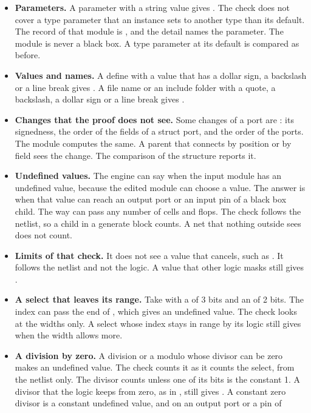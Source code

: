 \begin{itemize}
  .
\item \textbf{Parameters.} A parameter with a string value gives . The check
  does not cover a type parameter that an instance sets to another type than its default.
  The record of that module is , and the detail names the parameter. The module
  is never a black box. A type parameter at its default is compared as before.
\item \textbf{Values and names.}
  A define with a value that has a dollar sign, a backslash or a line break gives
  . A file name or an include folder with a quote, a backslash, a dollar sign
  or a line break gives .
\item \textbf{Changes that the proof does not see.} Some changes of a port are
  : its signedness, the order of the fields of a struct port, and the order of
  the ports. The module computes the same. A parent that connects by position or by field
  sees the change. The comparison of the structure reports it.
\item \textbf{Undefined values.} The engine can say  when the input module has an
  undefined value, because the edited module can choose a value. The answer is 
  when that value can reach an output port or an input pin of a black box child.
  The way can pass any number of cells and flops. The check follows the netlist, so a child
  in a generate block counts. A net that nothing outside sees does not count.
\item \textbf{Limits of that check.} It does not see a value that cancels, such as
  . It follows the netlist and not the logic. A value that other logic masks
  still gives .
\item \textbf{A select that leaves its range.} Take  with a  of
  3 bits and an  of 2 bits. The index can pass the end of , which gives an
  undefined value. The check looks at the widths only. A select whose index stays in range
  by its logic still gives  when the width allows more.
\item \textbf{A division by zero.} A division or a modulo whose divisor can be zero makes
  an undefined value. The check counts it as it counts the select, from the netlist
  only. The divisor counts unless one of its bits is the constant 1. A divisor that the logic
  keeps from zero, as in , still gives .
  A constant zero divisor is a constant undefined value, and on an output port or a pin of

\end{itemize}
